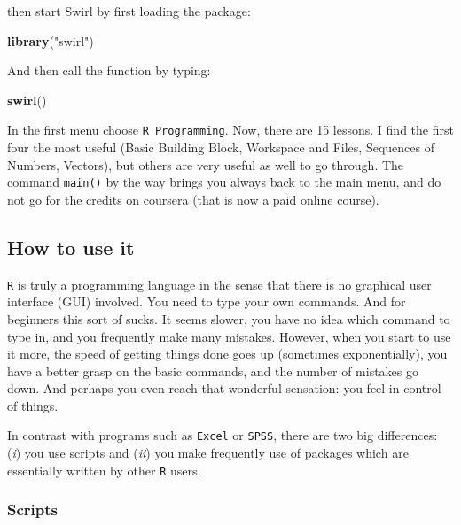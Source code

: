 \documentclass[]{article}
\newenvironment{Shaded}{\begin{snugshade}}{\end{snugshade}}
\newcommand{\KeywordTok}[1]{\textcolor[rgb]{0.13,0.29,0.53}{\textbf{{#1}}}}
\newcommand{\StringTok}[1]{\textcolor[rgb]{0.31,0.60,0.02}{{#1}}}
\newcommand{\NormalTok}[1]{{#1}}
\theoremstyle{definition}
\theoremstyle{definition}
\theoremstyle{definition}
\theoremstyle{remark}
\begin{document}
then start Swirl by first loading the package:

\begin{Shaded}
\begin{Highlighting}[]
\KeywordTok{library}\NormalTok{(}\StringTok{"swirl"}\NormalTok{)}
\end{Highlighting}
\end{Shaded}

And then call the function by typing:

\begin{Shaded}
\begin{Highlighting}[]
\KeywordTok{swirl}\NormalTok{()}
\end{Highlighting}
\end{Shaded}

In the first menu choose \texttt{R\ Programming}. Now, there are 15
lessons. I find the first four the most useful (Basic Building Block,
Workspace and Files, Sequences of Numbers, Vectors), but others are very
useful as well to go through. The command \texttt{main()} by the way
brings you always back to the main menu, and do not go for the credits
on coursera (that is now a paid online course).

\subsection{How to use it}\label{how-to-use-it}

\texttt{R} is truly a programming language in the sense that there is no
graphical user interface (GUI) involved. You need to type your own
commands. And for beginners this sort of sucks. It seems slower, you
have no idea which command to type in, and you frequently make many
mistakes. However, when you start to use it more, the speed of getting
things done goes up (sometimes exponentially), you have a better grasp
on the basic commands, and the number of mistakes go down. And perhaps
you even reach that wonderful sensation: you feel in control of things.

In contrast with programs such as \texttt{Excel} or \texttt{SPSS}, there
are two big differences: (\emph{i}) you use scripts and (\emph{ii}) you
make frequently use of packages which are essentially written by other
\texttt{R} users.

\subsubsection{Scripts}\label{subsec:scripts}
\end{document}
